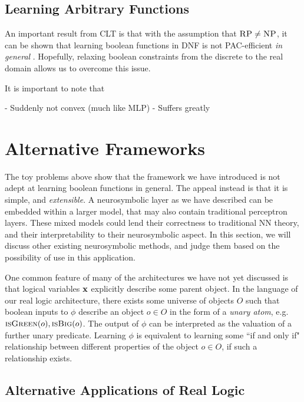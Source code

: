 
\subsection{Learning Arbitrary Functions}

An important result from CLT is that with the assumption that $\textsc{RP} \neq \textsc{NP}$, it can be shown that learning boolean functions in DNF is not PAC-efficient \textit{in general} \cite{clt}. Hopefully, relaxing boolean constraints from the discrete to the real domain allows us to overcome this issue.



It is important to note that 

- Suddenly not convex (much like MLP)
- Suffers greatly


\section{Alternative Frameworks}

The toy problems above show that the framework we have introduced is not adept at learning boolean functions in general. The appeal instead is that it is simple, and \textit{extensible}. A neurosymbolic layer as we have described can be embedded within a larger model, that may also contain traditional perceptron layers. These mixed models could lend their correctness to traditional NN theory, and their interpretability to their neurosymbolic aspect. In this section, we will discuss other existing neurosymbolic methods, and judge them based on the possibility of use in this application.

One common feature of many of the architectures we have not yet discussed is that logical variables $\mathbf{x}$ explicitly describe some parent object. In the language of our real logic architecture, there exists some universe of objects $O$ such that boolean inputs to $\phi$ describe an object $o \in O$ in the form of a \textit{unary atom}, e.g. $\textsc{isGreen}(o), \textsc{isBig}(o)$. The output of $\phi$ can be interpreted as the valuation of a further unary predicate. Learning $\phi$ is equivalent to learning some ``if and only if" relationship between different properties of the object $o\in O$, if such a relationship exists. 

\subsection{Alternative Applications of Real Logic}

